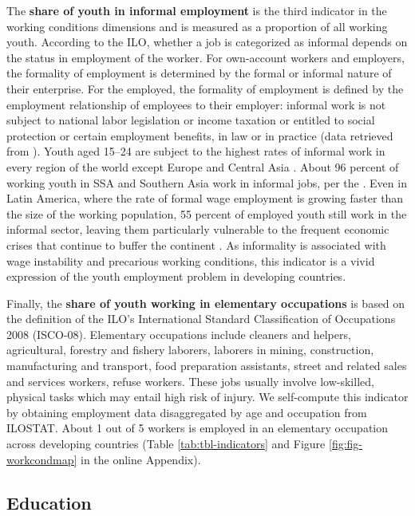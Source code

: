 \documentclass[
  a4paper, twoside, 12pt]{book}
\begin{document}
The \textbf{share of youth in informal employment} is the third indicator in the working conditions dimensions and is measured as a proportion of all working youth. According to the ILO, whether a job is categorized as informal depends on the status in employment of the worker. For own-account workers and employers, the formality of employment is determined by the formal or informal nature of their enterprise. For the employed, the formality of employment is defined by the employment relationship of employees to their employer: informal work is not subject to national labor legislation or income taxation or entitled to social protection or certain employment benefits, in law or in practice (data retrieved from \textcite{bonnet2018}). Youth aged 15--24 are subject to the highest rates of informal work in every region of the world except Europe and Central Asia \autocite{bonnet2018}. About 96 percent of working youth in SSA and Southern Asia work in informal jobs, per the \textcite{ilo2020}. Even in Latin America, where the rate of formal wage employment is growing faster than the size of the working population, 55 percent of employed youth still work in the informal sector, leaving them particularly vulnerable to the frequent economic crises that continue to buffer the continent \autocite{ilo2015}. As informality is associated with wage instability and precarious working conditions, this indicator is a vivid expression of the youth employment problem in developing countries.

Finally, the \textbf{share of youth working in elementary occupations} is based on the definition of the ILO's International Standard Classification of Occupations 2008 (ISCO-08). Elementary occupations include cleaners and helpers, agricultural, forestry and fishery laborers, laborers in mining, construction, manufacturing and transport, food preparation assistants, street and related sales and services workers, refuse workers. These jobs usually involve low-skilled, physical tasks which may entail high risk of injury. We self-compute this indicator by obtaining employment data disaggregated by age and occupation from ILOSTAT. About 1 out of 5 workers is employed in an elementary occupation across developing countries (Table \ref{tab:tbl-indicators} and Figure \ref{fig:fig-workcondmap} in the online Appendix).

\hypertarget{education}{%
\subsection{Education}\label{education}}
\end{document}
